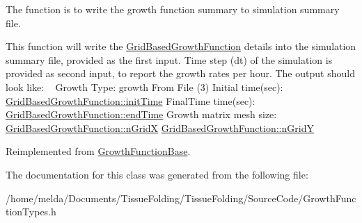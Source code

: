 The function is to write the growth function summary to simulation summary file. 

This function will write the \hyperlink{classGridBasedGrowthFunction}{Grid\+Based\+Growth\+Function} details into the simulation summary file, provided as the first input. Time step (dt) of the simulation is provided as second input, to report the growth rates per hour. The output should look like\+: ~\newline
 Growth Type\+: growth From File (3) Initial time(sec)\+: \hyperlink{classGrowthFunctionBase_ae92513a7b41637df8e26e7db35ddf97c}{Grid\+Based\+Growth\+Function\+::init\+Time} Final\+Time time(sec)\+: \hyperlink{classGrowthFunctionBase_a3ff4db0573d354a75666a5f3ca446941}{Grid\+Based\+Growth\+Function\+::end\+Time} Growth matrix mesh size\+: \hyperlink{classGridBasedGrowthFunction_af872b9963f3a579dcd615c23bcb58a86}{Grid\+Based\+Growth\+Function\+::n\+Grid\+X} \hyperlink{classGridBasedGrowthFunction_a625bc963a1f1e7d1f1a35dbd0ef51728}{Grid\+Based\+Growth\+Function\+::n\+Grid\+Y}

Reimplemented from \hyperlink{classGrowthFunctionBase}{Growth\+Function\+Base}.



The documentation for this class was generated from the following file\+:\begin{DoxyCompactItemize}
\item 
/home/melda/\+Documents/\+Tissue\+Folding/\+Tissue\+Folding/\+Source\+Code/Growth\+Function\+Types.\+h\end{DoxyCompactItemize}
